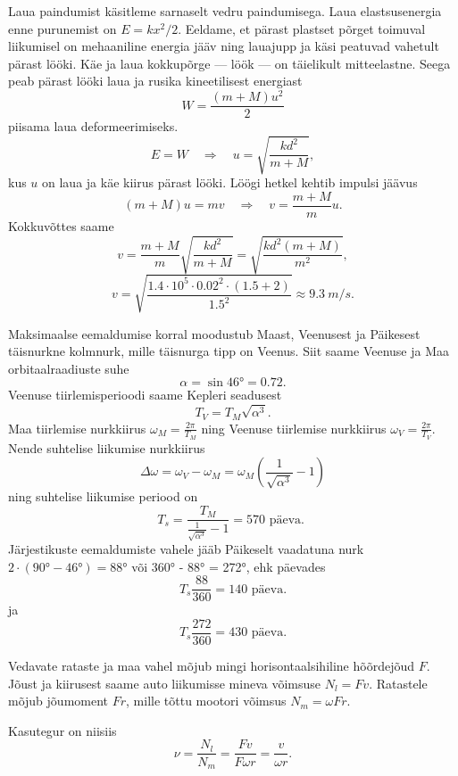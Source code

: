 \documentclass[10pt, twoside]{article}
\begin{document}
{
\solu
Laua paindumist käsitleme sarnaselt vedru paindumisega. Laua elastsusenergia enne purunemist on $E = kx^2/2$. Eeldame, et pärast plastset põrget toimuval liikumisel on mehaaniline energia jääv ning lauajupp ja käsi peatuvad vahetult pärast lööki. Käe ja laua kokkupõrge --- löök --- on täielikult mitteelastne. Seega peab pärast lööki laua ja rusika kineetilisest energiast
\[
W = \frac{(m+M)u^2}{2}
\]
piisama laua deformeerimiseks.
\[
E=W \quad \Rightarrow \quad u=\sqrt{\frac{k d^{2}}{m+M}},
\]
kus $u$ on laua ja käe kiirus pärast lööki. Löögi hetkel kehtib impulsi jäävus
\[
(m+M) u=m v \quad \Rightarrow \quad v=\frac{m+M}{m} u.
\]
Kokkuvõttes saame
\[
	v=\frac{m+M}{m} \sqrt{\frac{k d^{2}}{m+M}}=\sqrt{\frac{k d^{2}(m+M)}{m^{2}}},
\]
\[
	 v=\sqrt{\frac{\num{1,4} \cdot 10^{5} \cdot \num{0,02}^{2} \cdot(\num{1,5}+2)}{\num{1,5}^{2}}} \approx \SI{9,3}{m/s}.
\]
\probend
\bigskip


\solu
\osa Maksimaalse eemaldumise korral moodustub Maast, Veenusest ja Päikesest täisnurkne kolmnurk, mille täisnurga tipp on Veenus. Siit saame Veenuse ja Maa orbitaalraadiuste suhe
\[
\alpha = \sin \ang{46} = \num{0,72}.
\]
\osa Veenuse tiirlemisperioodi saame Kepleri seadusest
\[
T_V = T_M \sqrt{\alpha^3}.
\]
Maa tiirlemise nurkkiirus $\omega_M = \frac{2\pi}{T_M}$ ning Veenuse tiirlemise nurkkiirus $\omega_V = \frac{2\pi}{T_V}$. Nende suhtelise liikumise nurkkiirus
\[
\Delta \omega=\omega_{V}-\omega_{M}=\omega_{M}\left(\frac{1}{\sqrt{\alpha^{3}}}-1\right)
\]
ning suhtelise liikumise periood on
\[
T_{s}=\frac{T_{M}}{\frac{1}{\sqrt{\alpha^{3}}}-1}=570 \text { päeva. }
\]
Järjestikuste eemaldumiste vahele jääb Päikeselt vaadatuna nurk $2\cdot (\ang{90} - \ang{46}) = \ang{88}$ või \ang{360} - \ang{88} = \ang{272}, ehk päevades 
\[
T_s \frac{88}{360} = 140\text{ päeva.}
\]
ja 
\[
T_s \frac{272}{360} = 430\text{ päeva.}
\]
\probend
\bigskip


\solu
Vedavate rataste ja maa vahel mõjub mingi horisontaalsihiline hõõrdejõud $F$. Jõust ja kiirusest saame auto liikumisse mineva võimsuse $N_l = Fv$. Ratastele mõjub jõumoment $Fr$, mille tõttu mootori võimsus $N_{m}=\omega F r$.

Kasutegur on niisiis
\[
\nu=\frac{N_{l}}{N_{m}}=\frac{F v}{F \omega r}=\frac{v}{\omega r}.
\]
\probend
\bigskip

}
\end{document}
